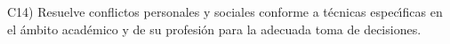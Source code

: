 C14) Resuelve conflictos personales y sociales conforme a t\'{e}cnicas
espec\'{\i}ficas en el \'{a}mbito acad\'{e}mico y de su profesi\'{o}n para la adecuada
toma de decisiones.
